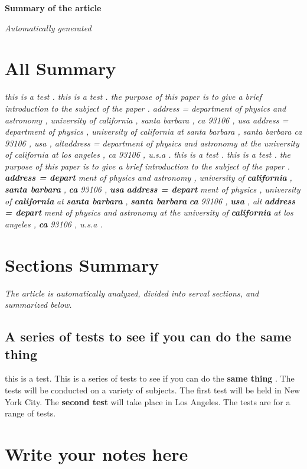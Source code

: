 \documentclass{article}%
\begin{document}
%
\normalsize%
\pagestyle{header}%
\begin{minipage}{\textwidth}%
\centering%
\begin{Large}%
\textbf{Summary of the article}%
\end{Large}%
\linebreak%
\begin{large}%
\textit{Automatically generated}%
\end{large}%
\end{minipage}%
\section{All Summary}%
\label{sec:AllSummary}%
\textit{this is a test .   this is a test .      the purpose of this paper is to give a brief introduction to the subject of the paper .       address = department of physics and astronomy , university of california , santa barbara , ca 93106 , usa     address = department of physics , university of california at santa barbara , santa barbara ca 93106 , usa , altaddress = department of physics and astronomy at the university of california at los angeles , ca 93106 , u.s.a .}%
\textit{this is a test .   this is a test .      the purpose of this paper is to give a brief introduction to the subject of the paper .       }%
\textbf{\textit{address = depart}}%
\textit{ment of physics and astronomy , university of }%
\textbf{\textit{california}}%
\textit{ , }%
\textbf{\textit{santa barbara}}%
\textit{ , }%
\textbf{\textit{ca}}%
\textit{ 93106 , }%
\textbf{\textit{usa}}%
\textit{     }%
\textbf{\textit{address = depart}}%
\textit{ment of physics , university of }%
\textbf{\textit{california}}%
\textit{ at }%
\textbf{\textit{santa barbara}}%
\textit{ , }%
\textbf{\textit{santa barbara}}%
\textit{ }%
\textbf{\textit{ca}}%
\textit{ 93106 , }%
\textbf{\textit{usa}}%
\textit{ , alt}%
\textbf{\textit{address = depart}}%
\textit{ment of physics and astronomy at the university of }%
\textbf{\textit{california}}%
\textit{ at los angeles , }%
\textbf{\textit{ca}}%
\textit{ 93106 , u.s.a .}

%
\section{Sections Summary}%
\label{sec:SectionsSummary}%
\textit{The article is automatically analyzed, divided into serval sections, and summarized below.\newline%
}

%
\begin{minipage}{0.95\textwidth}%
\subsection{A series of tests to see if you can do the same thing}%
\label{subsec:Aseriesofteststoseeifyoucandothesamething}%
this is a test. This is a series of tests to see if you can do the %
\textbf{same thing}%
. The tests will be conducted on a variety of subjects. The first test will be held in New York City. The %
\textbf{second test}%
 will take place in Los Angeles.    The tests are for a range of tests.

%
\end{minipage}%
\section{Write your notes here}%
\label{sec:Writeyournoteshere}%

%
\end{document}

